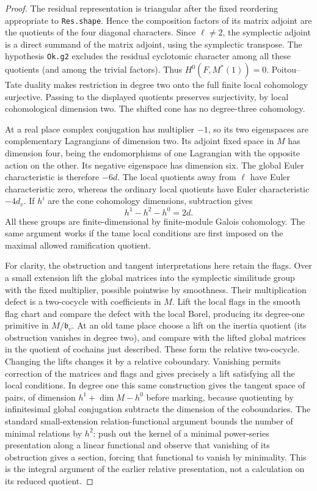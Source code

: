 \begin{proof}
The residual representation is triangular after the fixed
reordering appropriate to \texttt{Res.shape}. Hence the
composition factors of its matrix adjoint are the quotients
of the four diagonal characters. Since $\ell\ne2$, the
symplectic adjoint is a direct summand of the matrix adjoint,
using the symplectic transpose. The hypothesis \texttt{Ok.g2}
excludes the residual cyclotomic character among all these
quotients (and among the trivial factors). Thus
$H^0(F,M^*(1))=0$. Poitou--Tate duality makes restriction
in degree two onto the full finite local cohomology
surjective. Passing to the displayed quotients preserves
surjectivity, by local cohomological dimension two. The
shifted cone has no degree-three cohomology.

At a real place complex conjugation has multiplier $-1$,
so its two eigenspaces are complementary Lagrangians of
dimension two. Its adjoint fixed space in $M$ has dimension
four, being the endomorphisms of one Lagrangian with the
opposite action on the other. Its negative eigenspace has
dimension six. The global Euler characteristic is therefore
$-6d$. The local quotients away from $\ell$ have Euler
characteristic zero, whereas the ordinary local quotients
have Euler characteristic $-4d_v$. If $h^i$ are the cone
cohomology dimensions, subtraction gives
\[
                       h^1-h^2-h^0=2d.                 \tag{CP1}
\]
All these groups are finite-dimensional by finite-module
Galois cohomology. The same argument works if the tame
local conditions are first imposed on the maximal allowed
ramification quotient.

For clarity, the obstruction and tangent interpretations here
retain the flags. Over a small extension lift the global
matrices into the symplectic similitude group with the fixed
multiplier, possible pointwise by smoothness. Their
multiplication defect is a two-cocycle with coefficients in
$M$. Lift the local flags in the smooth flag chart and
compare the defect with the local Borel, producing its
degree-one primitive in $M/\mathfrak b_v$. At an old tame
place choose a lift on the inertia quotient (its obstruction
vanishes in degree two), and compare with the lifted global
matrices in the quotient of cochains just described.
These form the relative two-cocycle. Changing the lifts
changes it by a relative coboundary. Vanishing permits
correction of the matrices and flags and gives precisely a
lift satisfying all the local conditions. In degree one this
same construction gives the tangent space of pairs, of
dimension $h^1+\dim M-h^0$ before marking, because quotienting
by infinitesimal global conjugation subtracts the dimension
of the coboundaries. The standard small-extension
relation-functional argument bounds the number of minimal
relations by $h^2$: push out the kernel of a minimal
power-series presentation along a linear functional and
observe that vanishing of its obstruction gives a section,
forcing that functional to vanish by minimality. This is
the integral argument of the earlier relative presentation,
not a calculation on its reduced quotient.


\end{proof}
